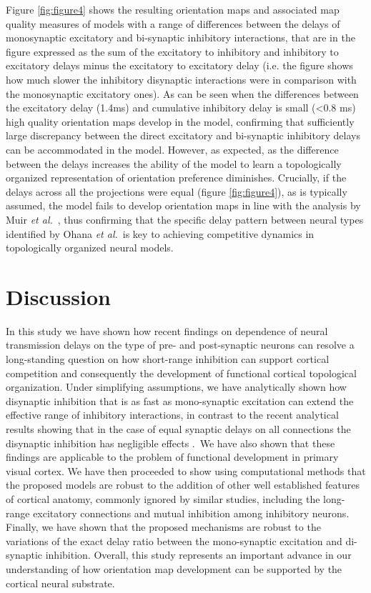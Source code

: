 \documentclass[utf8]{frontiersSCNS}
\newcommand{\etal}{\textit{et al.}}
\begin{document}
Figure \ref{fig:figure4} shows the resulting orientation maps and associated map quality measures of models with a range of differences between the delays of monosynaptic excitatory and bi-synaptic inhibitory interactions, that are in the figure expressed as the sum of the excitatory to inhibitory and inhibitory to excitatory delays minus the excitatory to excitatory delay (i.e. the figure shows how much slower the inhibitory disynaptic interactions were in comparison with the monosynaptic excitatory ones). 
As can be seen when the differences between the excitatory delay (1.4ms) and cumulative inhibitory delay is small (\textless 0.8 ms) high quality orientation maps develop in the model, confirming that sufficiently 
large discrepancy between the direct excitatory and bi-synaptic inhibitory delays can be accommodated in the model. However, as expected, as the difference between the delays increases the ability of the model to learn a topologically organized representation of orientation preference diminishes. Crucially, if the delays across all the projections were equal (figure \ref{fig:figure4}), as is typically assumed, the model fails to develop orientation maps in line with the analysis by Muir \etal \, \citep{Muir2014}, thus confirming that the specific delay pattern between neural types identified by Ohana \etal\,\citep{Ohana2012} is key to achieving competitive dynamics in topologically organized neural models.

\section{Discussion}

In this study we have shown how recent findings on dependence of neural transmission delays on the
type of pre- and post-synaptic neurons \citep{Ohana2012} can resolve a long-standing question on how short-range inhibition
can support cortical competition and consequently the development of functional cortical topological organization.
Under simplifying assumptions, we have analytically shown how disynaptic inhibition that is as fast as mono-synaptic 
excitation can extend the effective range of inhibitory interactions, in contrast to the recent analytical 
results showing that in the case of equal synaptic delays on all connections the disynaptic inhibition has negligible effects \citep{Muir2014}.\
We have also shown that these findings are applicable to the problem of functional development in primary visual cortex. We have then proceeded 
to show using computational methods that the proposed models are robust to the addition of other well established features of cortical anatomy, commonly ignored by similar studies, including the long-range excitatory connections and mutual inhibition among inhibitory neurons. Finally, we have shown that the proposed mechanisms are robust to the variations of the exact delay ratio between the mono-synaptic excitation and di-synaptic inhibition. Overall, this study represents an important advance in our understanding of how orientation map development can be supported by the cortical neural substrate. 
\end{document}
